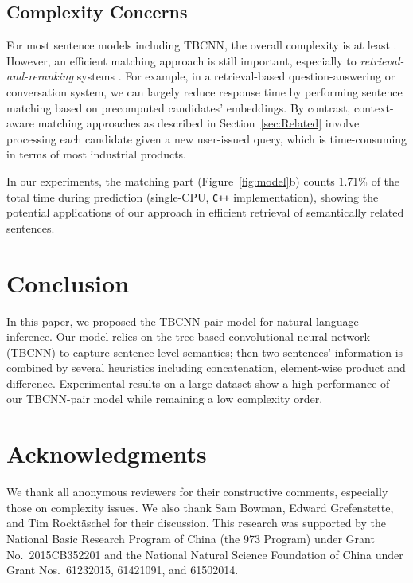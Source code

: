 \documentclass[11pt]{article}
\begin{document}
\subsection{Complexity Concerns}



For most sentence models including TBCNN, the overall complexity is at least . However, an efficient matching approach is still important, especially to \textit{retrieval-and-reranking} systems \cite{sigir,ijcai}. For example, in a retrieval-based question-answering or conversation system, we can largely reduce response time by performing sentence matching based on precomputed candidates' embeddings. By contrast, context-aware matching approaches as described in Section~\ref{sec:Related} involve processing each candidate given a new user-issued query, which is time-consuming in terms of most industrial products. 

In our experiments, the matching part (Figure~\ref{fig:model}b) counts 1.71\% of the total time during prediction (single-CPU, \texttt{C++} implementation), showing the potential applications of our approach in efficient retrieval of semantically related sentences.


\section{Conclusion}\label{sec:Conclusion}


In this paper, we proposed the TBCNN-pair model for natural language inference. Our model relies on the tree-based convolutional neural network (TBCNN) to capture sentence-level semantics; then two sentences' information is combined by several heuristics including concatenation, element-wise product and difference. Experimental results on a large dataset show a high performance of our TBCNN-pair model while remaining a low complexity order.



\section*{Acknowledgments}


We thank all anonymous reviewers for their constructive comments, especially those on complexity issues. We also thank Sam Bowman, Edward Grefenstette, and Tim Rockt\"aschel for their discussion. This research was supported by the National Basic Research Program of China (the 973 Program) under Grant No.~2015CB352201 and the National Natural Science Foundation of China under Grant Nos.~61232015, 61421091, and 61502014.

\newpage


\end{document}
